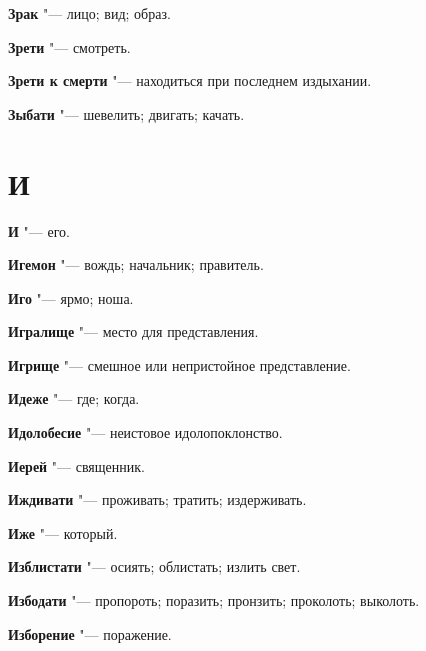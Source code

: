 \begin{mymulticols}{2}
\noindent\textbf{Зрак} "--- лицо; вид; образ. 




\noindent\textbf{Зрети} "--- смотреть. 




\noindent\textbf{Зрети к смерти} "--- находиться при последнем издыхании. 




\noindent\textbf{Зыбати} "--- шевелить; двигать; качать. 




\section{И}





\noindent\textbf{И} "--- его. 




\noindent\textbf{Игемон} "--- вождь; начальник; правитель. 




\noindent\textbf{Иго} "--- ярмо; ноша. 




\noindent\textbf{Игралище} "--- место для представления. 




\noindent\textbf{Игрище} "--- смешное или непристойное представление. 




\noindent\textbf{Идеже} "--- где; когда. 




\noindent\textbf{Идолобесие} "--- неистовое идолопоклонство. 




\noindent\textbf{Иерей} "--- священник. 




\noindent\textbf{Иждивати} "--- проживать; тратить; издерживать. 




\noindent\textbf{Иже} "--- который. 




\noindent\textbf{Изблистати} "--- осиять; облистать; излить свет. 




\noindent\textbf{Избодати} "--- пропороть; поразить; пронзить; проколоть; выколоть. 




\noindent\textbf{Изборение} "--- поражение. 





\end{mymulticols}
